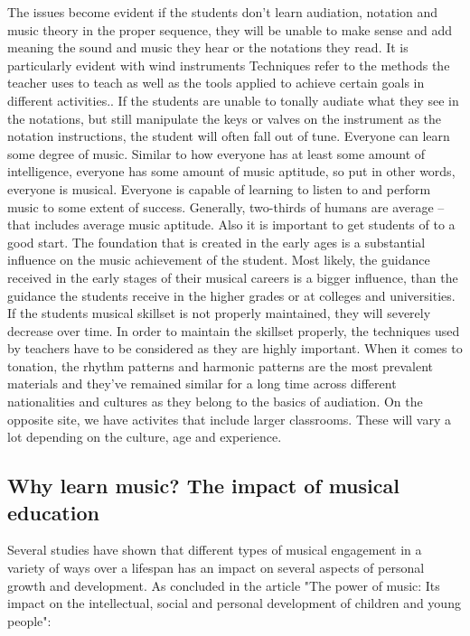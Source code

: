 	The issues become evident if the students don’t learn audiation, notation and music theory in the proper sequence, they will be unable to make sense and add meaning the sound and music they hear or the notations they read. It is particularly evident with wind instruments Techniques refer to the methods the teacher uses to teach as well as the tools applied to achieve certain goals in different activities.. If the students are unable to tonally audiate what they see in the notations, but still manipulate the keys or valves on the instrument as the notation instructions, the student will often fall out of tune.
	Everyone can learn some degree of music. Similar to how everyone has at least some amount of intelligence, everyone has some amount of music aptitude, so put in other words, everyone is musical. Everyone is capable of learning to listen to and perform music to some extent of success. Generally, two-thirds of humans are average – that includes average music aptitude.
	Also it is important to get students of to a good start. The foundation that is created in the early ages is a substantial influence on the music achievement of the student. Most likely, the guidance received in the early stages of their musical careers is a bigger influence, than the guidance the students receive in the higher grades or at colleges and universities. If the students musical skillset is not properly maintained, they will severely decrease over time.
	In order to maintain the skillset properly, the techniques used by teachers have to be considered as
	they are highly important. When it comes to tonation, the rhythm patterns and harmonic patterns are the most prevalent materials and they’ve remained similar for a long time across different nationalities and cultures as they belong to the basics of audiation. On the opposite site, we have activites that include larger classrooms. These will vary a lot depending on the culture, age and experience.\\
	
	
	\subsection{Why learn music? The impact of musical education}
	Several studies have shown that different types of musical engagement in a variety of ways over a lifespan has an impact on several aspects of personal growth and development. As concluded in the article "The power of music: Its impact on the intellectual, social and personal development of children and young people":\\
	
